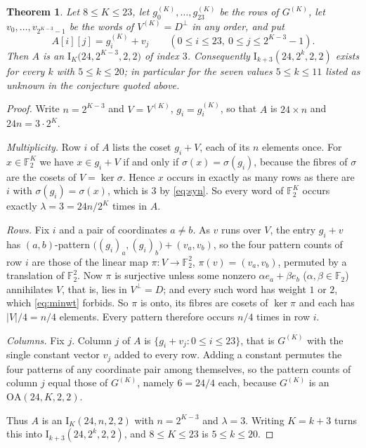\documentclass[11pt]{amsart}
\newtheorem{theorem}{Theorem}
\newcommand{\Idesign}{\mathrm{I}}
\newcommand{\OA}{\mathrm{OA}}
\newcommand{\FF}{\mathbb{F}_2}
\begin{document}
\begin{theorem}\label{thm:main}
Let $8\le K\le23$, let $g^{(K)}_0,\dots,g^{(K)}_{23}$ be the rows of $G^{(K)}$, let
$v_0,\dots,v_{2^{K-3}-1}$ be the words of $V^{(K)}=D^{\perp}$ in any order, and put
\[
 A[i][j]=g^{(K)}_i+v_j\qquad (0\le i\le23,\ 0\le j\le 2^{K-3}-1).
\]
Then $A$ is an $\Idesign_K\bigl(24,2^{K-3},2,2\bigr)$ of index $3$. Consequently
$\Idesign_{k+3}(24,2^k,2,2)$ exists for every $k$ with $5\le k\le20$; in particular for the seven
values $5\le k\le11$ listed as unknown in the conjecture quoted above.
\end{theorem}

\begin{proof}
Write $n=2^{K-3}$ and $V=V^{(K)}$, $g_i=g^{(K)}_i$, so that $A$ is $24\times n$ and
$24n=3\cdot2^{K}$.

\emph{Multiplicity.} Row $i$ of $A$ lists the coset $g_i+V$, each of its $n$ elements once. For
$x\in\FF^{K}$ we have $x\in g_i+V$ if and only if $\sigma(x)=\sigma(g_i)$, because the fibres of
$\sigma$ are the cosets of $V=\ker\sigma$. Hence $x$ occurs in exactly as many rows as there are
$i$ with $\sigma(g_i)=\sigma(x)$, which is $3$ by \eqref{eq:syn}. So every word of $\FF^K$ occurs
exactly $\lambda=3=24n/2^{K}$ times in $A$.

\emph{Rows.} Fix $i$ and a pair of coordinates $a\ne b$. As $v$ runs over $V$, the entry
$g_i+v$ has $(a,b)$-pattern $\bigl((g_i)_a,(g_i)_b\bigr)+(v_a,v_b)$, so the four pattern counts of
row $i$ are those of the linear map $\pi\colon V\to\FF^2$, $\pi(v)=(v_a,v_b)$, permuted by a
translation of $\FF^2$. Now $\pi$ is surjective unless some nonzero
$\alpha e_a+\beta e_b$ ($\alpha,\beta\in\FF$) annihilates $V$, that is, lies in
$V^{\perp}=D$; and every such word has weight $1$ or $2$, which \eqref{eq:minwt} forbids. So $\pi$
is onto, its fibres are cosets of $\ker\pi$ and each has $\lvert V\rvert/4=n/4$ elements. Every
pattern therefore occurs $n/4$ times in row $i$.

\emph{Columns.} Fix $j$. Column $j$ of $A$ is $\{g_i+v_j : 0\le i\le 23\}$, that is $G^{(K)}$ with
the single constant vector $v_j$ added to every row. Adding a constant permutes the four patterns of
any coordinate pair among themselves, so the pattern counts of column $j$ equal those of
$G^{(K)}$, namely $6=24/4$ each, because $G^{(K)}$ is an $\OA(24,K,2,2)$.

Thus $A$ is an $\Idesign_K(24,n,2,2)$ with $n=2^{K-3}$ and $\lambda=3$. Writing $K=k+3$ turns this
into $\Idesign_{k+3}(24,2^{k},2,2)$, and $8\le K\le23$ is $5\le k\le20$.
\end{proof}
\end{document}
